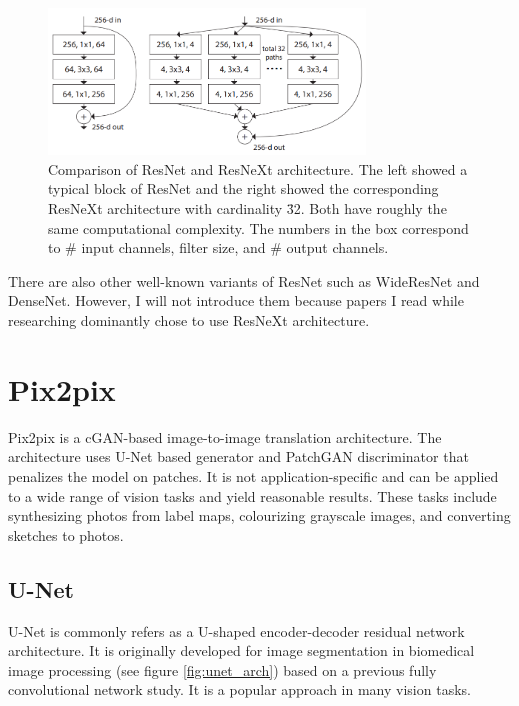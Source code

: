\begin{figure}
    \centering
    \includegraphics[width=0.75\textwidth]{images/preliminary/resnet_resnext_cmp.png}
    \caption{Comparison of ResNet and ResNeXt architecture. The left showed a typical block of ResNet and the right showed the corresponding ResNeXt architecture with cardinality \= 32. Both have roughly the same computational complexity. The numbers in the box correspond to \# input channels, filter size, and \# output channels.\cite{xieAggregatedResidualTransformations2017a}} 
    \label{fig:resnet_resnext_cmp}
\end{figure}

There are also other well-known variants of ResNet such as WideResNet and DenseNet. However, I will not introduce them because papers I read while researching dominantly chose to use ResNeXt architecture.



\section{Pix2pix}
Pix2pix is a cGAN-based image-to-image translation architecture. The architecture uses U-Net based generator and PatchGAN discriminator that penalizes the model on patches. It is not application-specific and can be applied to a wide range of vision tasks and yield reasonable results. These tasks include synthesizing photos from label maps, colourizing grayscale images, and converting sketches to photos.

\subsection{U-Net}
U-Net\cite{ronnebergerUNetConvolutionalNetworks2015} is commonly refers as a U-shaped encoder-decoder residual network architecture. It is originally developed for image segmentation in biomedical image processing (see figure \ref{fig:unet_arch}) based on a previous fully convolutional network study\cite{longFullyConvolutionalNetworks2015}. It is a popular approach in many vision tasks.

